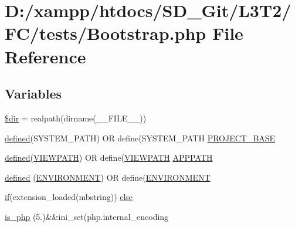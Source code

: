 \hypertarget{_bootstrap_8php}{}\section{D\+:/xampp/htdocs/\+S\+D\+\_\+\+Git/\+L3\+T2/\+F\+C/tests/\+Bootstrap.php File Reference}
\label{_bootstrap_8php}
\subsection*{Variables}
\begin{DoxyCompactItemize}
\item 
\hyperlink{_bootstrap_8php_a1659f0a629d408e0f849dbe4ee061e62}{\$dir} = realpath(dirname(\+\_\+\+\_\+\+F\+I\+L\+E\+\_\+\+\_\+))
\item 
\hyperlink{_bootstrap_8php_a46458e8654a714e0565e20f63021add9}{defined}(\textquotesingle{}S\+Y\+S\+T\+E\+M\+\_\+\+P\+A\+T\+H\textquotesingle{}) O\+R define(\textquotesingle{}S\+Y\+S\+T\+E\+M\+\_\+\+P\+A\+T\+H\textquotesingle{} \hyperlink{_bootstrap_8php_a8731a5d504a6592ae43e07a048933c32}{P\+R\+O\+J\+E\+C\+T\+\_\+\+B\+A\+S\+E}
\item 
\hyperlink{_bootstrap_8php_a46458e8654a714e0565e20f63021add9}{defined}(\textquotesingle{}\hyperlink{index_8php_ade8921d52af58583e5727833459224c3}{V\+I\+E\+W\+P\+A\+T\+H}\textquotesingle{}) O\+R define(\textquotesingle{}\hyperlink{index_8php_ade8921d52af58583e5727833459224c3}{V\+I\+E\+W\+P\+A\+T\+H}\textquotesingle{} \hyperlink{_bootstrap_8php_a45cc636071e9edf22e5709d3c18bc84f}{A\+P\+P\+P\+A\+T\+H}
\item 
\hyperlink{_bootstrap_8php_a46458e8654a714e0565e20f63021add9}{defined} (\textquotesingle{}\hyperlink{index_8php_a8757a57d09df5349f8b93b2083e29a1e}{E\+N\+V\+I\+R\+O\+N\+M\+E\+N\+T}\textquotesingle{}) O\+R define(\textquotesingle{}\hyperlink{index_8php_a8757a57d09df5349f8b93b2083e29a1e}{E\+N\+V\+I\+R\+O\+N\+M\+E\+N\+T}\textquotesingle{}
\item 
\hyperlink{excanvas_8js_a409038cddd5fb941140f7ff76f5b7b15}{if}(extension\+\_\+loaded(\textquotesingle{}mbstring\textquotesingle{})) \hyperlink{_bootstrap_8php_a67773d041d277deb84668d80e4099034}{else}
\item 
\hyperlink{_bootstrap_8php_acbea7ca989439eea4c6019ad3c5161aa}{is\+\_\+php} (\textquotesingle{}5.\textquotesingle{})\&\&ini\+\_\+set(\textquotesingle{}php.\+internal\+\_\+encoding\textquotesingle{}
\end{DoxyCompactItemize}


